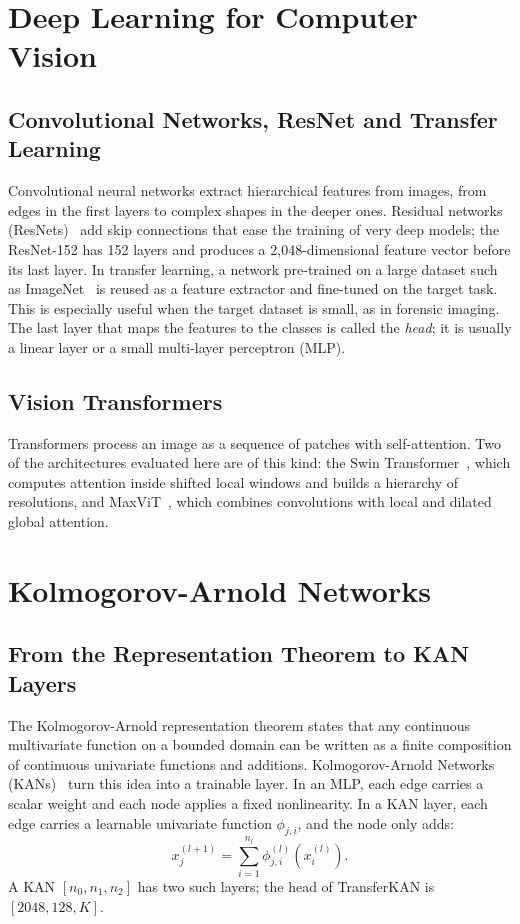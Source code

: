 \section{Deep Learning for Computer Vision}
\label{sec:dl_background}

\subsection{Convolutional Networks, ResNet and Transfer Learning}
Convolutional neural networks extract hierarchical features from images, from edges in the first layers to complex shapes in the deeper ones. Residual networks (ResNets)~\cite{he2016resnet} add skip connections that ease the training of very deep models; the ResNet-152 has 152 layers and produces a 2,048-dimensional feature vector before its last layer. In transfer learning, a network pre-trained on a large dataset such as ImageNet~\cite{deng2009imagenet} is reused as a feature extractor and fine-tuned on the target task. This is especially useful when the target dataset is small, as in forensic imaging. The last layer that maps the features to the classes is called the \emph{head}; it is usually a linear layer or a small multi-layer perceptron (MLP).

\subsection{Vision Transformers}
Transformers process an image as a sequence of patches with self-attention. Two of the architectures evaluated here are of this kind: the Swin Transformer~\cite{liu2021swin}, which computes attention inside shifted local windows and builds a hierarchy of resolutions, and MaxViT~\cite{tu2022maxvit}, which combines convolutions with local and dilated global attention.

\section{Kolmogorov-Arnold Networks}
\label{sec:kan_background}

\subsection{From the Representation Theorem to KAN Layers}
The Kolmogorov-Arnold representation theorem states that any continuous multivariate function on a bounded domain can be written as a finite composition of continuous univariate functions and additions. Kolmogorov-Arnold Networks (KANs)~\cite{liu2024kan} turn this idea into a trainable layer. In an MLP, each edge carries a scalar weight and each node applies a fixed nonlinearity. In a KAN layer, each edge carries a learnable univariate function $\phi_{j,i}$, and the node only adds:
\begin{equation}
x^{(l+1)}_j = \sum_{i=1}^{n_l} \phi^{(l)}_{j,i}\!\left(x^{(l)}_i\right).
\end{equation}
A KAN $[n_0, n_1, n_2]$ has two such layers; the head of TransferKAN is $[2048, 128, K]$.

